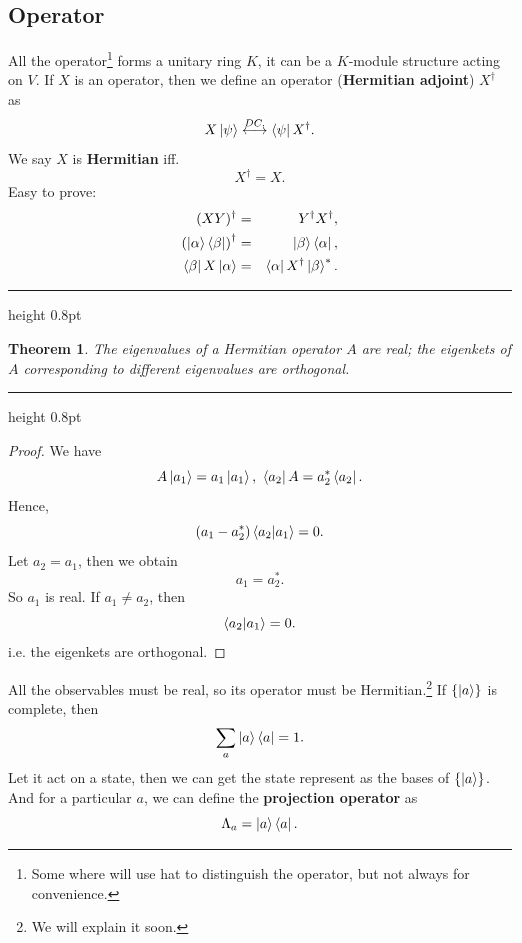\documentclass{article}
\newcommand{\singleline}{\hrule height 0.8pt}
\theoremstyle{1}
\newtheorem{theorem}[problem]{Theorem}
\begin{document}
\subsection{Operator}
All the operator\footnote{Some where will use hat to distinguish the operator, but not always for convenience.} forms a unitary ring $K$, it can be a $K$-module structure acting on $V$. If $X$ is an operator, then we define an operator (\textbf{Hermitian adjoint}) $X^\dagger$ as 
\begin{equation}
   X\ket{\psi} \overset{DC.}{\longleftrightarrow}\bra{\psi}X^\dagger.
\end{equation}
We say $X$ is \textbf{Hermitian} iff.
\begin{equation}
    X^\dagger=X.
\end{equation}
Easy to prove:
\begin{eqnarray}
    (XY)^\dagger&=&Y^\dagger X^\dagger,\\
    \left(\ket{\alpha}\bra{\beta}\right)^\dagger&=&\ket{\beta}\bra{\alpha},\\
    \bra{\beta}X\ket{\alpha}&=&\bra{\alpha}X^\dagger\ket{\beta}^*.
\end{eqnarray}
\singleline
\begin{theorem}
    \quad The eigenvalues of a Hermitian operator $A$ are real; the eigenkets
of $A$ corresponding to different eigenvalues are orthogonal.
\end{theorem}
\singleline
\begin{proof}
    We have 
    \begin{equation}
        A\ket{a_1}=a_1\ket{a_1},\  \bra{a_2}A=a_2^*\bra{a_2}.
    \end{equation}
Hence, 
\begin{equation}
    \left(a_1-a_2^*\right)\braket{a_2}{a_1}=0.
\end{equation}
Let $a_2=a_1$, then we obtain
\begin{equation}
    a_1=a_2^*.
\end{equation}
So $a_1$ is real. If $a_1\not=a_2$, then 
\begin{equation}
    \braket{a_2}{a_1}=0.
\end{equation}
i.e. the eigenkets are orthogonal.
\end{proof}
All the observables must be real, so its operator must be Hermitian.\footnote{We will explain it soon.}
\newline
If $\left\{\ket{a}\right\}$ is complete, then 
\begin{equation}\label{unit operator}
    \sum_{a}\ket{a}\bra{a}=1.
\end{equation}
Let it act on a state, then we can get the state represent as the bases of $\left\{\ket{a}\right\}$. And for a particular $a$, we can define the \textbf{projection operator} as 
\begin{equation}
    \Lambda_a=\ket{a}\bra{a}.
\end{equation}
\end{document}
